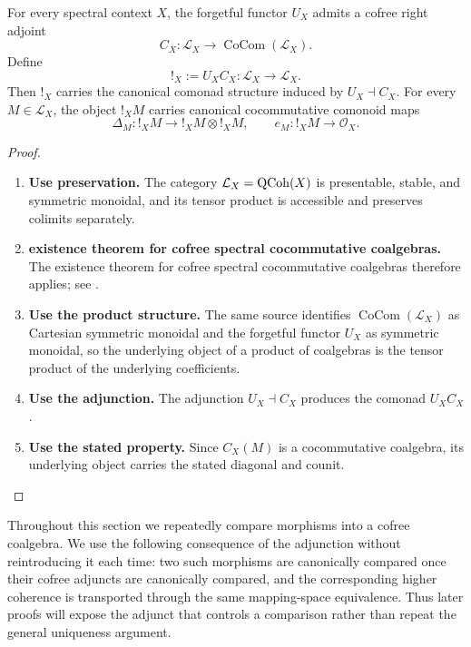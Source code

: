 \begin{theorem}
\label{thm:cofree-coalgebra-linear-exponential}
For every spectral context \(X\), the forgetful functor \(U_X\) admits a
cofree right adjoint
\[
    C_X:\mathcal L_X\longrightarrow\operatorname{CoCom}(\mathcal L_X).
\]
Define
\[
    !_X:=U_XC_X:\mathcal L_X\longrightarrow\mathcal L_X.
\]
Then \(!_X\) carries the canonical comonad structure induced by
\(U_X\dashv C_X\). For every \(M\in\mathcal L_X\), the object \(!_XM\)
carries canonical cocommutative comonoid maps
\[
    \Delta_M:!_XM\longrightarrow !_XM\otimes !_XM,
    \qquad
    e_M:!_XM\longrightarrow\mathcal O_X.
\]
\end{theorem}

\begin{proof}
\leavevmode
\begin{enumerate}[label=\textup{(\arabic*)}]
    \item \textbf{Use preservation.}
    The category \(\mathcal L_X=\operatorname{QCoh}(X)\) is presentable, stable, and symmetric monoidal, and its tensor
    product is accessible and preserves colimits separately.

    \item \textbf{existence theorem for cofree spectral cocommutative coalgebras.}
    The existence theorem for cofree spectral cocommutative coalgebras therefore applies; see
    \cite{BachmannBurklund2026Coalgebras}.

    \item \textbf{Use the product structure.}
    The same source identifies \(\operatorname{CoCom}(\mathcal L_X)\) as Cartesian symmetric monoidal and the forgetful
    functor \(U_X\) as symmetric monoidal, so the underlying object of a product of
    coalgebras is the tensor product of the underlying coefficients.

    \item \textbf{Use the adjunction.}
    The adjunction \(U_X\dashv C_X\) produces the comonad \(U_XC_X\).

    \item \textbf{Use the stated property.}
    Since \(C_X(M)\) is a cocommutative coalgebra, its underlying object carries the stated
    diagonal and counit.
\end{enumerate}
\end{proof}

Throughout this section we repeatedly compare morphisms into a cofree
coalgebra. We use the following consequence of the adjunction without
reintroducing it each time: two such morphisms are canonically compared once
their cofree adjuncts are canonically compared, and the corresponding higher
coherence is transported through the same mapping-space equivalence. Thus
later proofs will expose the adjunct that controls a comparison rather than
repeat the general uniqueness argument.


